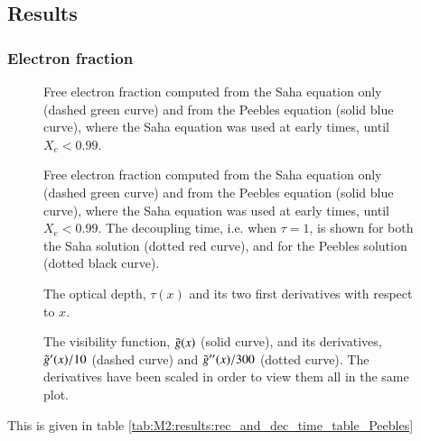 \subsection{Results}\label{ssec:M2:results}


\subsubsection{Electron fraction} \label{sssec:M2:results:electron_fraction}

\begin{figure}[ht!]
    \caption{Free electron fraction computed from the Saha equation only (dashed green curve) and from the Peebles equation (solid blue curve), where the Saha equation was used at early times, until $X_e<0.99$.}
    \label{fig:M2:results:compare_Xe_peebles_saha}
\end{figure}


\begin{figure}[ht!]
    \caption{Free electron fraction computed from the Saha equation only (dashed green curve) and from the Peebles equation (solid blue curve), where the Saha equation was used at early times, until $X_e<0.99$. The decoupling time, i.e. when $\tau=1$, is shown for both the Saha solution (dotted red curve), and for the Peebles solution (dotted black curve).}
    \label{fig:M2:results:decoupling_compare_Xe_peebles_saha}
\end{figure}

\begin{figure}[ht!]
    \caption{The optical depth, $\tau(x)$ and its two first derivatives with respect to $x$.}
    \label{fig:M2:results:tau_plot}
\end{figure}


\begin{figure}[ht!]
    \caption{The visibility function, $\tilde{g}(x)$ (solid curve), and its derivatives, $\tilde{g}'(x)/10$ (dashed curve) and $\tilde{g}''(x)/300$ (dotted curve). The derivatives have been scaled in order to view them all in the same plot.}
    \label{fig:M2:results:g_plot}
\end{figure}




This is given in table \ref{tab:M2:results:rec_and_dec_time_table_Peebles}